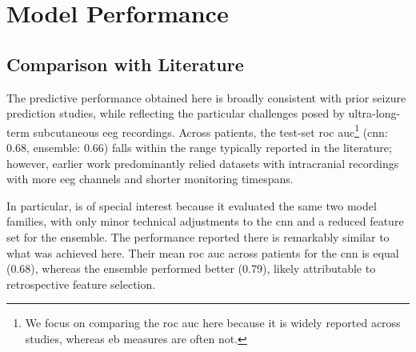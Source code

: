 \section{Model Performance}\label{subsec:discussion-model-performance}

\subsection{Comparison with Literature}





The predictive performance obtained here is broadly consistent with prior seizure prediction studies, while reflecting the particular challenges posed by ultra-long-term subcutaneous \gls{eeg} recordings.
Across patients, the test-set \gls{roc auc}\footnote{We focus on comparing the \gls{roc auc} here because it is widely reported across studies, whereas \gls{eb} measures are often not.} (\gls{cnn}: \num{0.68}, ensemble: \num{0.66}) falls within the range typically reported in the literature; however, earlier work predominantly relied datasets with intracranial recordings with more \gls{eeg} channels and shorter monitoring timespans.

In particular, \textcite{muller_coherent_2022} is of special interest because it evaluated the same two model families, with only minor technical adjustments to the \gls{cnn} and a reduced feature set for the ensemble.
The performance reported there is remarkably similar to what was achieved here.
Their mean \gls{roc auc} across patients for the \gls{cnn} is equal (\num{0.68}), whereas the ensemble performed better (\num{0.79}), likely attributable to retrospective feature selection.

